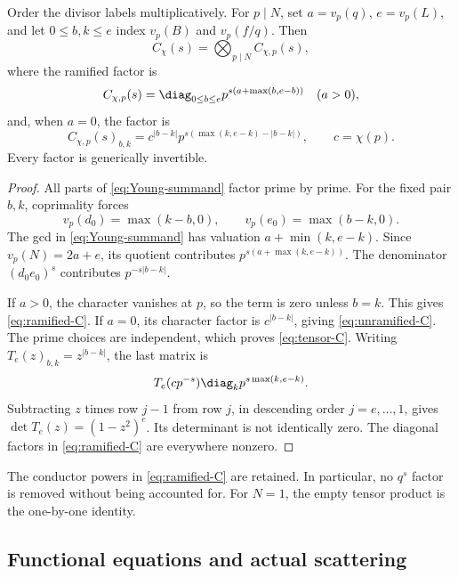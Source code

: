 \begin{lemma}\label{lem:local-incoming}
Order the divisor labels multiplicatively. For \(p\mid N\), set
\(a=v_p(q)\), \(e=v_p(L)\), and let \(0\le b,k\le e\) index
\(v_p(B)\) and \(v_p(f/q)\). Then
\begin{equation}\label{eq:tensor-C}
 C_\chi(s)=\bigotimes_{p\mid N}C_{\chi,p}(s),
\end{equation}
where the ramified factor is
\begin{equation}\label{eq:ramified-C}
 C_{\chi,p}(s)=
 \diag_{0\le b\le e}p^{s(a+\max(b,e-b))}
 \quad (a>0),
\end{equation}
and, when \(a=0\), the factor is
\begin{equation}\label{eq:unramified-C}
 C_{\chi,p}(s)_{b,k}
 =c^{|b-k|}p^{s(\max(k,e-k)-|b-k|)},\qquad c=\chi(p).
\end{equation}
Every factor is generically invertible.
\end{lemma}
\begin{proof}
All parts of \eqref{eq:Young-summand} factor prime by prime. For the
fixed pair \(b,k\), coprimality forces
\[
 v_p(d_0)=\max(k-b,0),\qquad
 v_p(e_0)=\max(b-k,0).
\]
The gcd in \eqref{eq:Young-summand} has valuation
\(a+\min(k,e-k)\). Since \(v_p(N)=2a+e\), its quotient contributes
\(p^{s(a+\max(k,e-k))}\). The denominator
\((d_0e_0)^s\) contributes \(p^{-s|b-k|}\).

If \(a>0\), the character vanishes at \(p\), so the term is zero
unless \(b=k\). This gives \eqref{eq:ramified-C}. If \(a=0\), its
character factor is \(c^{|b-k|}\), giving \eqref{eq:unramified-C}.
The prime choices are independent, which proves \eqref{eq:tensor-C}.
Writing \(T_e(z)_{b,k}=z^{|b-k|}\), the last matrix is
\[
 T_e(cp^{-s})\diag_k p^{s\max(k,e-k)}.
\]
Subtracting \(z\) times row \(j-1\) from row \(j\), in descending
order \(j=e,\ldots,1\), gives
\(\det T_e(z)=(1-z^2)^e\). Its determinant is not identically zero.
The diagonal factors in \eqref{eq:ramified-C} are everywhere nonzero.
\end{proof}

The conductor powers in \eqref{eq:ramified-C} are retained. In
particular, no \(q^s\) factor is removed without being accounted for.
For \(N=1\), the empty tensor product is the one-by-one identity.

\subsection{Functional equations and actual scattering}

